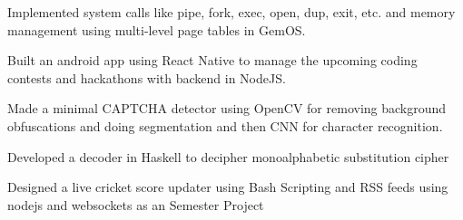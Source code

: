 
\begin{itemize}
  {\Large
  \item Implemented system calls like pipe, fork, exec, open, dup, exit, etc. and memory management using multi-level page tables in GemOS.
  \vspace{1mm}
  \item Built an android app using React Native to manage the upcoming coding contests and hackathons with backend in NodeJS.
  \vspace{1mm}  
  \item Made a minimal CAPTCHA detector using OpenCV for removing background obfuscations and doing segmentation and then CNN for character recognition.
  \vspace{1mm}  
  \item Developed a decoder in Haskell to decipher monoalphabetic substitution cipher
  \vspace{1mm}
  \item Designed a live cricket score updater using Bash Scripting and RSS feeds
  \vspace{1.5mm}
    \ifdefined \ONEPAGE \else
    using nodejs and
    websockets as an Semester Project
    \fi
    \vspace{2mm}
    }
\end{itemize}